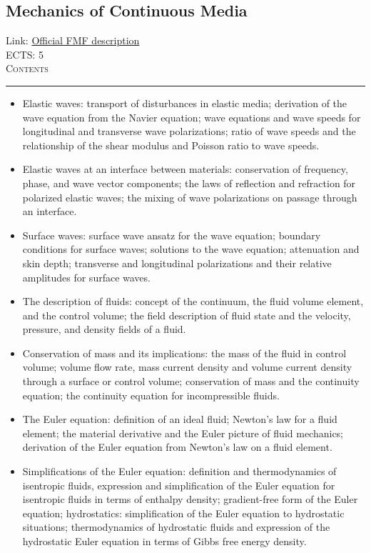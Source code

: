 \documentclass[11pt, a4paper]{article}
\newenvironment{course}[3]{
\subsection{#1}%
Link: \href{#2}{Official FMF description}\\%
ECTS: #3%
\vspace{1ex}
\\
{\large \textsc{Contents}}\\[-0.9ex]%
\rule{\textwidth}{0.5pt}
\vspace{-3ex}
}
{}
\newenvironment{chapter}[1]{
\begin{tcolorbox}[title=#1, breakable]
}
{\end{tcolorbox}}
\begin{document}
\begin{course}{Mechanics of Continuous Media}{https://www.fmf.uni-lj.si/en/study-physics/programmes/1fiz/2020/7000777/courses/1160/}{5}
\begin{chapter}{Applications of the theory of elasticity}
\begin{itemize}
            \item Elastic waves: transport of disturbances in elastic media; derivation of the wave equation from the Navier equation; wave equations and wave speeds for longitudinal and transverse wave polarizations; ratio of wave speeds and the relationship of the shear modulus and Poisson ratio to wave speeds.

            \item Elastic waves at an interface between materials: conservation of frequency, phase, and wave vector components; the laws of reflection and refraction for polarized elastic waves; the mixing of wave polarizations on passage through an interface.

            \item Surface waves: surface wave ansatz for the wave equation; boundary conditions for surface waves; solutions to the wave equation; attenuation and skin depth; transverse and longitudinal polarizations and their relative amplitudes for surface waves.
        
        \end{itemize}
    \end{chapter}

    \begin{chapter}{Mechanics of ideal fluids}
        \begin{itemize}
        
            \item The description of fluids: concept of the continuum, the fluid volume element, and the control volume; the field description of fluid state and the velocity, pressure, and density fields of a fluid.

            \item Conservation of mass and its implications: the mass of the fluid in control volume; volume flow rate, mass current density and volume current density through a surface or control volume; conservation of mass and the continuity equation; the continuity equation for incompressible fluids.

            \item The Euler equation: definition of an ideal fluid; Newton's law for a fluid element; the material derivative and the Euler picture of fluid mechanics; derivation of the Euler equation from Newton's law on a fluid element.

            \item Simplifications of the Euler equation: definition and thermodynamics of isentropic fluids, expression and simplification of the Euler equation for isentropic fluids in terms of enthalpy density; gradient-free form of the Euler equation;
            hydrostatics: simplification of the Euler equation to hydrostatic situations; thermodynamics of hydrostatic fluids and expression of the hydrostatic Euler equation in terms of Gibbs free energy density.


\end{itemize}
\end{chapter}
\end{course}
\end{document}
